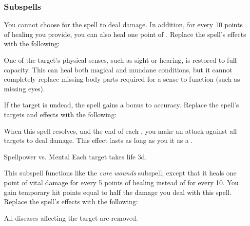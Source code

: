 \subsubsection{Subspells}
You cannot choose for the spell to deal damage.
In addition, for every 10 points of healing you provide, you can also heal one point of .
Replace the spell's effects with the following:
\begin{spellcontent}
\begin{augmenteffects}
\spelleffect
One of the target's physical senses, such as sight or hearing, is restored to full capacity.
This can heal both magical and mundane conditions, but it cannot completely replace missing body parts required for a sense to function (such as missing eyes).
\end{augmenteffects}
\end{spellcontent}
If the target is undead, the spell gains a  bonus to accuracy.
Replace the spell's targets and effects with the following:
\begin{spellcontent}
\begin{augmenttargetinginfo}
\end{augmenttargetinginfo}
\begin{augmenteffects}
\spelleffect
When this spell resolves, and the end of each , you make an attack against all targets to deal damage.
This effect lasts as long as you  it as a .
\begin{spellattack}{Spellpower vs. Mental}
\spellsuccess
Each target takes life  \minus3d.
\end{spellattack}
\end{augmenteffects}
\end{spellcontent}
This subspell functions like the \textit{cure wounds} subspell, except that it heals one point of vital damage for every 5 points of healing instead of for every 10.
You gain temporary hit points equal to half the damage you deal with this spell.
Replace the spell's effects with the following:
\begin{spellcontent}
\begin{augmenteffects}
\spelleffect
All diseases affecting the target are removed.
\end{augmenteffects}
\end{spellcontent}
